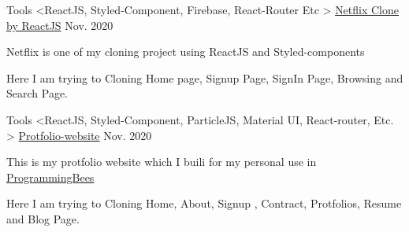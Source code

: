 

\begin{cventries}
  \cventry
    {Tools <ReactJS, Styled-Component, Firebase, React-Router Etc >} %
    {\href{https://github.com/programmingbees/Netflix-clone}{Netflix Clone by ReactJS}} %
    {} %
    {Nov. 2020} %
    {
      \begin{cvitems} %
        \item {Netflix is one of my cloning project using ReactJS and Styled-components}
        \item {Here I am trying to Cloning Home page, Signup Page, SignIn Page, Browsing and Search Page.}
      \end{cvitems}
    }
    \cventry
    {Tools <ReactJS, Styled-Component, ParticleJS, Material UI, React-router, Etc. >} %
    {\href{https://github.com/programmingbees/My-Protfolio}{Protfolio-website}} %
    {} %
    {Nov. 2020} %
    {
      \begin{cvitems} %
        \item {This is my protfolio website which I buili for my personal use in \href{https://programmingbees.com}{ProgrammingBees} }
        \item {Here I am trying to Cloning Home, About, Signup , Contract, Protfolios, Resume and Blog Page.}
      \end{cvitems}
    }
    

\end{cventries}